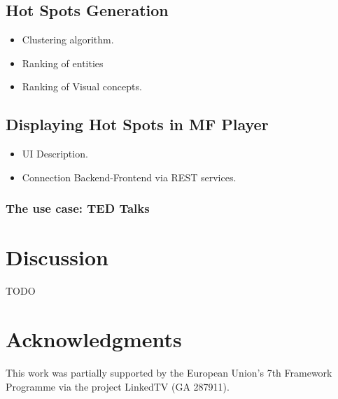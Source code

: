 \documentclass{llncs}
\begin{document}
\subsection{Hot Spots Generation}
\label{sec:fragmentsgeneration}

\begin{itemize}
  \item Clustering algorithm.
  \item Ranking of entities
  \item Ranking of Visual concepts.
\end{itemize}

\subsection{Displaying Hot Spots in MF Player}

\begin{itemize}
  \item UI Description.
  \item Connection Backend-Frontend via REST services.
\end{itemize}

\subsubsection{The use case: TED Talks}
\label{sec:usecase}

		

\section{Discussion}
\label{sec:discussion}

TODO


\section*{Acknowledgments}
This work was partially supported by the European Union's 7th Framework Programme via the project LinkedTV (GA 287911).



\end{document}

